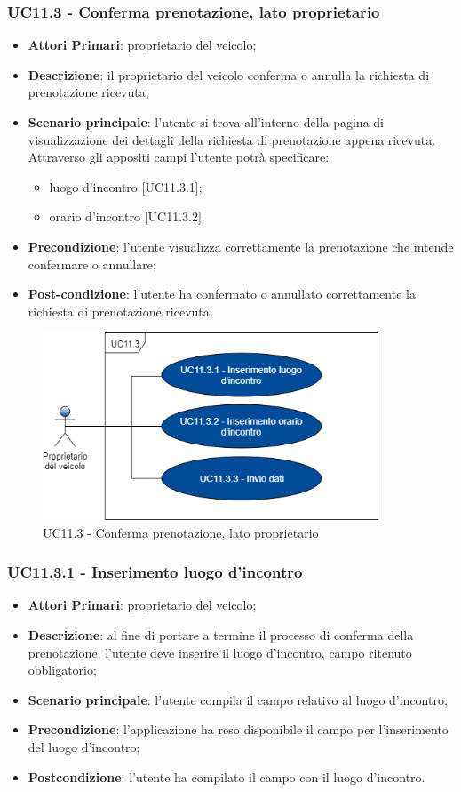 \subsubsection{UC11.3 - Conferma prenotazione, lato proprietario}
\begin{itemize}
	\item \textbf{Attori Primari}: proprietario del veicolo;
	\item \textbf{Descrizione}: il proprietario del veicolo conferma o annulla la richiesta di prenotazione ricevuta;
	\item \textbf{Scenario principale}: l'utente si trova all'interno della pagina di visualizzazione dei dettagli della richiesta di prenotazione appena ricevuta. Attraverso gli appositi campi l'utente potrà specificare:
	\begin{itemize}
		\item luogo d'incontro [UC11.3.1];
		\item orario d'incontro [UC11.3.2].
	\end{itemize} 
	\item \textbf{Precondizione}: l'utente visualizza correttamente la prenotazione che intende confermare o annullare;
	\item \textbf{Post-condizione}: l'utente ha confermato o annullato correttamente la richiesta di prenotazione ricevuta.
\end{itemize}
\begin{figure}[h]
	\includegraphics[width=10cm]{res/images/UC11-3Conferma.png}
	\centering
	\caption{UC11.3 - Conferma prenotazione, lato proprietario}
\end{figure}

\subsubsection{UC11.3.1 - Inserimento luogo d'incontro}
\begin{itemize}
	\item \textbf{Attori Primari}: proprietario del veicolo;
	\item \textbf{Descrizione}: al fine di portare a termine il processo di conferma della prenotazione, l'utente deve inserire il luogo d'incontro, campo ritenuto obbligatorio;
	\item \textbf{Scenario principale}: l'utente compila il campo relativo al luogo d'incontro;	
	\item \textbf{Precondizione}: l'applicazione ha reso disponibile il campo per l'inserimento del luogo d'incontro;
	\item \textbf{Postcondizione}: l'utente ha compilato il campo con il luogo d'incontro.	
\end{itemize}


